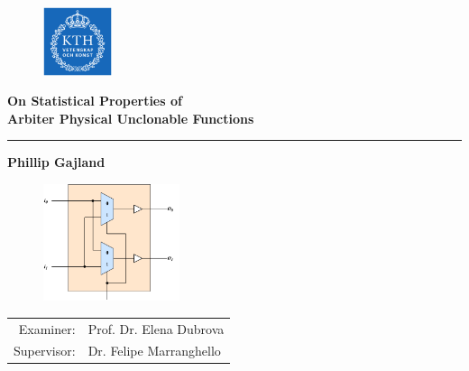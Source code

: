 \documentclass[10pt, compress]{beamer}
\begin{document}
\begin{frame}[plain,t]
    \begin{figure}
        \begin{flushright}
        \vspace{-2.25cm}
        \includegraphics[width = 20mm]{figures/kth_logo.png}
        \end{flushright}
    \end{figure}
    
    \vspace{2cm}
    
    {\large\textbf{On Statistical Properties of\\[0.25cm]
    Arbiter Physical Unclonable Functions}}
    \\\rule{7.5cm}{1pt}
    
    \vspace{0.5cm}
    
    {\large\textbf{Phillip Gajland}}
    \vspace{0.5cm}
    \begin{figure}
        \begin{flushright}
        \vspace{-2cm}
        \includegraphics[width = 40mm]{figures/switch_block_detailed.pdf}
        \end{flushright}
    \end{figure}
    
    \vspace{1cm}
    
    {\normalsize
    \begin{tabular}{ r l }
    Examiner: & Prof. Dr. Elena Dubrova\\
    Supervisor: & Dr. Felipe Marranghello
    \end{tabular}}
\end{frame}
\end{document}
